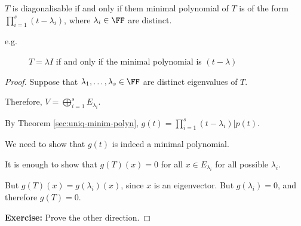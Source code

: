 \documentclass[11pt]{scrartcl}
\begin{document}
\begin{theorem}
  $T$ is diagonalisable if and only if them minimal polynomial of $T$ is of the form $\prod_{i=1}^{s} (t-\lambda_i)$, where $\lambda_i\in\FF$ are distinct.
\end{theorem}
\begin{description}

\item[e.g.] $T = \lambda I$ if and only if the minimal polynomial is $(t-\lambda)$

\end{description}
\begin{proof}
  \hfill

  Suppose that $\lambda_1, \dots, \lambda_s\in\FF$ are  distinct eigenvalues of $T$.

  Therefore, $V = \bigoplus_{i=1}^{s} E_{\lambda_i}$.

  By Theorem \ref{sec:uniq-minim-polyn}, $g(t) = \prod_{i=1}^{s} (t-\lambda_i) | p(t)$.

  We need to show that $g(t)$ is indeed a minimal polynomial.

  It is enough to show that $g(T)(x) = 0$ for all $x\in E_{\lambda_i}$
  for all possible $\lambda_i$.

  But $g(T)(x) = g(\lambda_i)(x)$, since $x$ is an eigenvector. But
  $g(\lambda_i) = 0$, and therefore $g(T) = 0$.

  \textbf{Exercise:} Prove the other direction.
\end{proof}
\end{document}
